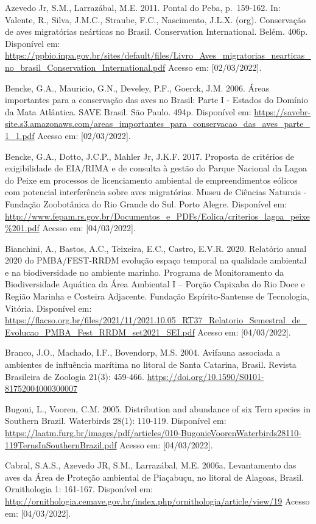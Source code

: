 \documentclass[
  oneside]{scrbook}
\begin{document}
Azevedo Jr, S.M., Larrazábal, M.E. 2011. Pontal do Peba, p.~159-162. In: Valente, R., Silva, J.M.C., Straube, F.C., Nascimento, J.L.X. (org). Conservação de aves migratórias neárticas no Brasil. Conservation International. Belém. 406p. Disponível em: \url{https://ppbio.inpa.gov.br/sites/default/files/Livro_Aves_migratorias_nearticas_no_brasil_Conservation_International.pdf} Acesso em: {[}02/03/2022{]}.

Bencke, G.A., Mauricio, G.N., Develey, P.F., Goerck, J.M. 2006. Áreas importantes para a conservação das aves no Brasil: Parte I - Estados do Domínio da Mata Atlântica. SAVE Brasil. São Paulo. 494p. Disponível em: \url{https://savebr-site.s3.amazonaws.com/areas_importantes_para_conservacao_das_aves_parte_1_1.pdf} Acesso em: {[}02/03/2022{]}.

Bencke, G.A., Dotto, J.C.P., Mahler Jr, J.K.F. 2017. Proposta de critérios de exigibilidade de EIA/RIMA e de consulta à gestão do Parque Nacional da Lagoa do Peixe em processos de licenciamento ambiental de empreendimentos eólicos com potencial interferência sobre aves migratórias. Museu de Ciências Naturais - Fundação Zoobotânica do Rio Grande do Sul. Porto Alegre. Disponível em: \url{http://www.fepam.rs.gov.br/Documentos_e_PDFs/Eolica/criterios_lagoa_peixe\%201.pdf} Acesso em: {[}04/03/2022{]}.

Bianchini, A., Bastos, A.C., Teixeira, E.C., Castro, E.V.R. 2020. Relatório anual 2020 do PMBA/FEST-RRDM evolução espaço temporal na qualidade ambiental e na biodiversidade no ambiente marinho. Programa de Monitoramento da Biodiversidade Aquática da Área Ambiental I -- Porção Capixaba do Rio Doce e Região Marinha e Costeira Adjacente. Fundação Espírito-Santense de Tecnologia, Vitória. Disponível em: \url{https://flacso.org.br/files/2021/11/2021.10.05_RT37_Relatorio_Semestral_de_Evolucao_PMBA_Fest_RRDM_set2021_SEI.pdf} Acesso em: {[}04/03/2022{]}.

Branco, J.O., Machado, I.F., Bovendorp, M.S. 2004. Avifauna associada a ambientes de influência marítima no litoral de Santa Catarina, Brasil. Revista Brasileira de Zoologia 21(3): 459-466. \url{https://doi.org/10.1590/S0101-81752004000300007}

Bugoni, L., Vooren, C.M. 2005. Distribution and abundance of six Tern species in Southern Brazil. Waterbirds 28(1): 110-119. Disponível em: \url{https://laatm.furg.br/images/pdf/articles/010-BugonieVoorenWaterbirds28110-119TernsInSouthernBrazil.pdf} Acesso em: {[}04/03/2022{]}.

Cabral, S.A.S., Azevedo JR, S.M., Larrazábal, M.E. 2006a. Levantamento das aves da Área de Proteção ambiental de Piaçabuçu, no litoral de Alagoas, Brasil. Ornithologia 1: 161-167. Disponível em: \url{http://ornithologia.cemave.gov.br/index.php/ornithologia/article/view/19} Acesso em: {[}04/03/2022{]}.
\end{document}
